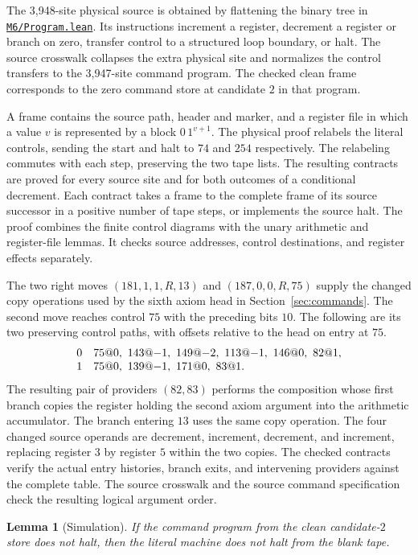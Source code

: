 \documentclass[11pt,letterpaper]{article}
\newtheorem{lemma}[theorem]{Lemma}
\newcommand{\src}[2]{\href{https://github.com/jamesyc/BusyBeaver/blob/main/#1}{\texttt{\nolinkurl{#2}}}}
\begin{document}
The 3,948-site physical source is obtained by flattening the binary tree
in \src{M6/Program.lean}{M6/Program.lean}. Its instructions increment a
register, decrement a register or branch on zero, transfer control to
a structured loop boundary, or halt. The source crosswalk collapses the
extra physical site and normalizes the control transfers to the
3,947-site command program. The checked clean frame corresponds to the
zero command store at candidate $2$ in that program.

A frame contains the source path, header and marker, and a register
file in which a value $v$ is represented by a block $0\,1^{v+1}$.
The physical proof relabels the literal controls, sending the start
and halt to $74$ and $254$ respectively. The relabeling commutes with
each step, preserving the two tape lists. The resulting contracts
are proved for every source site and for both outcomes of a conditional
decrement. Each contract takes a frame to the complete frame of its
source successor in a positive number of tape steps, or implements the
source halt. The proof combines the finite control diagrams with the
unary arithmetic and register-file lemmas. It checks source addresses,
control destinations, and register effects separately.

The two right moves $(181,1,1,R,13)$ and $(187,0,0,R,75)$ supply the
changed copy operations used by the sixth axiom head in
Section~\ref{sec:commands}. The second move reaches control $75$ with
the preceding bits $10$. The following are its two preserving control
paths, with offsets relative to the head on entry at $75$.
\[
\begin{array}{c@{\quad}l}
0 & 75@0,\ 143@{-1},\ 149@{-2},\ 113@{-1},\ 146@0,\ 82@1,\\
1 & 75@0,\ 139@{-1},\ 171@0,\ 83@1.
\end{array}
\]
The resulting pair of providers $(82,83)$ performs the composition
whose first branch copies the register holding the second axiom
argument into the arithmetic accumulator. The branch entering $13$
uses the same copy operation. The four changed source operands are
decrement, increment, decrement, and increment, replacing register
$3$ by register $5$ within the two copies. The checked contracts verify
the actual entry histories, branch exits, and intervening providers
against the complete table. The source crosswalk and the source
command specification check the resulting logical argument order.

\begin{lemma}[Simulation]\label{lem:simulation}
If the command program from the clean candidate-$2$ store does not
halt, then the literal machine does not halt from the blank tape.
\end{lemma}
\end{document}

